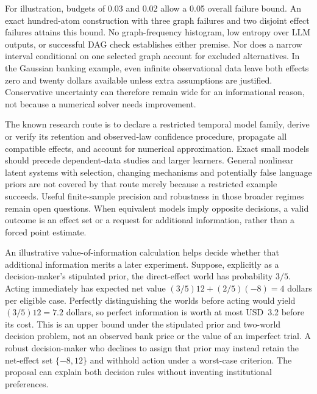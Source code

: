 For illustration, budgets of 0.03 and 0.02 allow a 0.05 overall failure bound.
An exact hundred-atom construction with three graph failures and two disjoint
effect failures attains this bound. No graph-frequency histogram, low
entropy over LLM outputs, or successful DAG check establishes either
premise. Nor does a narrow interval conditional on one selected graph
account for excluded alternatives. In the Gaussian banking example, even
infinite observational data leave both effects zero and twenty dollars
available unless extra assumptions are justified. Conservative uncertainty
can therefore remain wide for an informational reason, not because a
numerical solver needs improvement.
\citep{exec15_latent_exact}

The known research route is to declare a restricted temporal model family,
derive or verify its retention and observed-law confidence procedure,
propagate all compatible effects, and account for numerical approximation.
Exact small models should precede dependent-data studies and larger
learners. General nonlinear latent systems with selection, changing
mechanisms and potentially false language priors are not covered by that
route merely because a restricted example succeeds. Useful finite-sample
precision and robustness in those broader regimes remain open questions.
When equivalent models imply opposite decisions, a valid outcome is an
effect set or a request for additional information, rather than a forced
point estimate.
\citep{exec15_latent_design}

An illustrative value-of-information calculation helps decide whether that
additional information merits a later experiment. Suppose, explicitly as a
decision-maker's stipulated prior, the direct-effect world has probability
$3/5$. Acting immediately has expected net value
$(3/5)12+(2/5)(-8)=4$ dollars per eligible case. Perfectly distinguishing the
worlds before acting would yield $(3/5)12=7.2$ dollars, so perfect information
is worth at most USD~3.2 before its cost. This is an upper bound under the
stipulated prior and two-world decision problem, not an observed bank price
or the value of an imperfect trial. A robust decision-maker who declines to
assign that prior may instead retain the net-effect set $\{-8,12\}$ and
withhold action under a worst-case criterion. The proposal can explain both
decision rules without inventing institutional preferences.
\citep{exec15_latent_exact}

